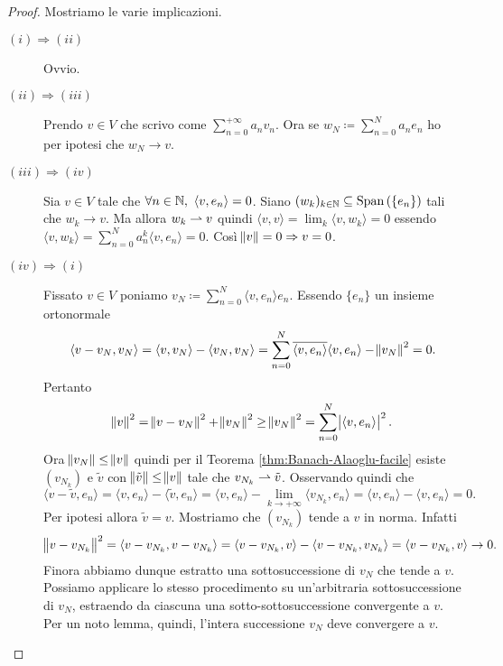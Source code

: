 \begin{proof}
    Mostriamo le varie implicazioni.
    \begin{description}
        \item[$ (i) \Rightarrow (ii) $] Ovvio.
        \item[$ (ii) \Rightarrow (iii) $] Prendo $ v \in V $ che scrivo come $ \sum_{n = 0}^{+\infty} a_n v_n $. Ora se $ w_{N} \coloneqq \sum_{n = 0}^{N} a_ne_n $ ho per ipotesi che $ w_N \to v $. 
        \item[$ (iii) \Rightarrow (iv) $] Sia $ v \in V $ tale che $ \forall n \in \mathbb{N}, \ {\langle v, e_n \rangle} = 0 $. Siano $ (w_k)_{k \in \mathbb{N}} \subseteq \operatorname{Span}{(\{e_n\})} $ tali che $ w_k \to v $. Ma allora $ w_k \rightharpoonup v $ quindi $ {\langle v, v \rangle} = \lim_{k} {\langle v, w_k \rangle} = 0 $ essendo $ {\langle v, w_k \rangle} = \sum_{n = 0}^{N} a_n^k {\langle v, e_n \rangle} = 0 $. Così $ \norm{v} = 0 \Rightarrow v = 0 $.
        \item[$ (iv) \Rightarrow (i) $] Fissato $ v \in V $ poniamo $ v_N \coloneqq \sum_{n = 0}^{N} {\langle v, e_n \rangle} e_n $. Essendo $ \{e_n\} $ un insieme ortonormale
        \[
            {\langle v - v_N, v_N \rangle} = {\langle v, v_N \rangle} - {\langle v_N, v_N \rangle} = \sum_{n = 0}^{N} \overline{{\langle v, e_n \rangle}}{\langle v, e_n \rangle} - \norm{v_N}^2 = 0.
        \]
        Pertanto
        \[
            \norm{v}^2 = \norm{v - v_N}^2 + \norm{v_N}^2 \geq \norm{v_N}^2 = \sum_{n = 0}^{N} \abs{{\langle v, e_n \rangle}}^2.
        \]
        Ora $ \norm{v_N} \leq \norm{v} $ quindi per il Teorema \ref{thm:Banach-Alaoglu-facile} esiste $ (v_{N_k}) $ e $ \tilde{v} $ con $ \norm{\tilde{v}} \leq \norm{v} $ tale che $ v_{N_k} \rightharpoonup \tilde{v} $. Osservando quindi che
        \[
            {\langle v - \tilde{v}, e_n \rangle} = {\langle v, e_n \rangle} - {\langle \tilde{v}, e_n \rangle} = {\langle v, e_n \rangle} - \lim_{k \to + \infty} {\langle v_{N_k}, e_n \rangle} = {\langle v, e_n \rangle} - {\langle v, e_n \rangle} = 0.
        \]
        Per ipotesi allora $ \tilde{v} = v $. Mostriamo che $ (v_{N_k}) $ tende a $ v $ in norma. Infatti
        \[
            \norm{v - v_{N_k}}^2 = {\langle v - v_{N_k}, v - v_{N_k}\rangle} = {\langle v - v_{N_k}, v \rangle} - {\langle v - v_{N_k}, v_{N_k} \rangle} = {\langle v - v_{N_k}, v \rangle} \to 0.
        \]
        Finora abbiamo dunque estratto una sottosuccessione di $ v_N $ che tende a $ v $. Possiamo applicare lo stesso procedimento su un'arbitraria sottosuccessione di $ v_N $, estraendo da ciascuna una sotto-sottosuccessione convergente a $ v $. Per un noto lemma, quindi, l'intera successione $ v_N $ deve convergere a $ v $. \qedhere
    \end{description}
\end{proof}

